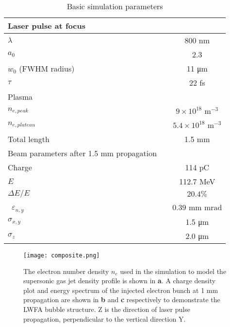 \documentclass[preprint,5p,times,sort&compress]{elsarticle}
\begin{document}
\begin{table}[htb]\centering
	\centering
	\caption{Basic simulation parameters}
	\begin{tabular}{lcc}
		\hline
		Laser pulse at focus \\
		\hline
		$\lambda$ && 800 \si{\nano\metre} \\
		$a_0$ && 2.3 \\
		$w_0$ (FWHM radius) && 11 \si{\micro\metre} \\
		$\tau$ && 22 fs\\
		\hline
		Plasma \\
		\hline
		$n_{e,peak}$ && $9 \times 10^{18}$  \si{\metre}$^{-3}$ \\ 
		$n_{e,plateau}$ && $5.4 \times 10^{18}$ \si{\metre}$^{-3}$ \\ 
		Total length && 1.5 \si{\milli\metre} \\
		\hline
		Beam parameters after 1.5 mm propagation \\
		\hline
		Charge && 114 pC \\
		$E$ && 112.7 MeV \\
		$\Delta E / E$ && $20.4 \%$ \\\
		$\varepsilon_{n,y}$ && $0.39$ mm mrad \\
		$\sigma_{x,y}$ && 1.5 \si{\micro\meter}  \\
		$\sigma_z$ &&  2.0 \si{\micro\meter}\\
		\hline
	\end{tabular}
	\label{tab:simulationParam}
\end{table}
\begin{figure}[htb]\centering
	\texttt{[image: composite.png]}
	\caption{The electron number density $n_e$ used in the simulation to model the supersonic gas jet density profile is shown in \textbf{a}. A charge density plot and energy spectrum of the injected electron bunch at 1 \si{\milli\meter} propagation are shown in \textbf{b} and \textbf{c} respectively to demonstrate the LWFA bubble structure. Z is the direction of laser pulse propagation, perpendicular to the vertical direction Y.}
	\label{fig:composite}
\end{figure}
\end{document}
